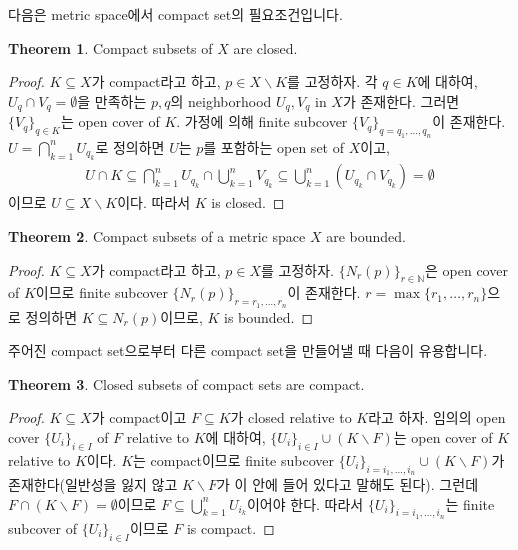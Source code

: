 \documentclass[12pt]{article}
\theoremstyle{definition}
\newtheorem{thm}{Theorem}[section]
\def\NN{\mathbb{N}}
\begin{document}
다음은 metric space에서 compact set의 필요조건입니다.

	\begin{thm}
		Compact subsets of \(X\) are closed.
	\end{thm}
	\begin{proof}
		\(K \subseteq X\)가 compact라고 하고, \(p \in X \backslash K\)를 고정하자. 각 \(q \in K\)에 대하여, \(U_q \cap V_q = \emptyset\)을 만족하는 \(p, q\)의 neighborhood \(U_q, V_q\) in \(X\)가 존재한다. 그러면 \(\{V_q\}_{q \in K}\)는 open cover of \(K\). 가정에 의해 finite subcover \(\{V_q\}_{q=q_1, \ldots, q_n}\)이 존재한다. \(U=\bigcap_{k=1}^n U_{q_k}\)로 정의하면 \(U\)는 \(p\)를 포함하는 open set of \(X\)이고,
		\begin{align*}
			U \cap K \subseteq \bigcap_{k=1}^n U_{q_k} \cap \bigcup_{k=1}^n V_{q_k} \subseteq \bigcup_{k=1}^n (U_{q_k} \cap V_{q_k}) = \emptyset
		\end{align*}
		이므로 \(U \subseteq X \backslash K\)이다. 따라서 \(K\) is closed.
	\end{proof}
	
	\begin{thm}
		Compact subsets of a metric space \(X\) are bounded.
	\end{thm}
	\begin{proof}
		\(K \subseteq X\)가 compact라고 하고, \(p \in X\)를 고정하자. \(\{N_r (p)\}_{r \in \NN}\)은 open cover of \(K\)이므로 finite subcover \(\{N_r (p)\}_{r=r_1, \ldots, r_n}\)이 존재한다. \(r = \max \{r_1, \ldots, r_n\}\)으로 정의하면 \(K \subseteq N_r (p)\)이므로, \(K\) is bounded.
	\end{proof}

주어진 compact set으로부터 다른 compact set을 만들어낼 때 다음이 유용합니다.

	\begin{thm} \label{thm cpt subset}
		Closed subsets of compact sets are compact.
	\end{thm}
	\begin{proof}
		\(K \subseteq X\)가 compact이고 \(F \subseteq K\)가 closed relative to \(K\)라고 하자. 임의의 open cover \(\{U_i\}_{i \in I}\) of \(F\) relative to \(K\)에 대하여, \(\{U_i\}_{i \in I} \cup (K \backslash F)\)는 open cover of \(K\) relative to \(K\)이다. \(K\)는 compact이므로 finite subcover \(\{U_i\}_{i=i_1, \ldots, i_n} \cup (K \backslash F)\)가 존재한다(일반성을 잃지 않고 \(K \backslash F\)가 이 안에 들어 있다고 말해도 된다). 그런데 \(F \cap (K \backslash F) = \emptyset \)이므로 \(F \subseteq \bigcup_{k=1}^n U_{i_k}\)이어야 한다. 따라서 \(\{U_i\}_{i=i_1, \ldots, i_n}\)는 finite subcover of \(\{U_i\}_{i \in I}\)이므로 \(F\) is compact.
	\end{proof}
\end{document}
